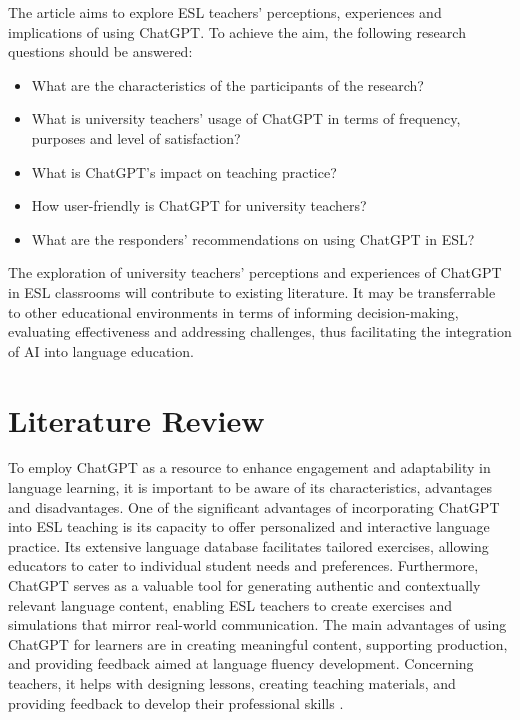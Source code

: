 \documentclass[english]{textolivre}
\begin{document}
The article aims to explore ESL teachers’ perceptions, experiences and implications of using ChatGPT. To achieve the aim, the following research questions should be answered:

\medskip
\begin{itemize}
    \item What are the characteristics of the participants of the research?
    \item What is university teachers’ usage of ChatGPT in terms of frequency, purposes and level of satisfaction?
    \item What is ChatGPT’s impact on teaching practice?
    \item How user-friendly is ChatGPT for university teachers?
    \item What are the responders’ recommendations on using ChatGPT in ESL?
\end{itemize}
\medskip

The exploration of university teachers’ perceptions and experiences of ChatGPT in ESL classrooms will contribute to existing literature. It may be transferrable to other educational environments in terms of informing decision-making, evaluating effectiveness and addressing challenges, thus facilitating the integration of AI into language education.

\section{Literature Review}
To employ ChatGPT as a resource to enhance engagement and adaptability in language learning, it is important to be aware of its characteristics, advantages and disadvantages. One of the significant advantages of incorporating ChatGPT into ESL teaching is its capacity to offer personalized and interactive language practice. Its extensive language database facilitates tailored exercises, allowing educators to cater to individual student needs and preferences. Furthermore, ChatGPT serves as a valuable tool for generating authentic and contextually relevant language content, enabling ESL teachers to create exercises and simulations that mirror real-world communication. The main advantages of using ChatGPT for learners are in creating meaningful content, supporting production, and providing feedback aimed at language fluency development. Concerning teachers, it helps with designing lessons, creating teaching materials, and providing feedback to develop their professional skills \cite[p. 3]{meniado2023}.
\end{document}
